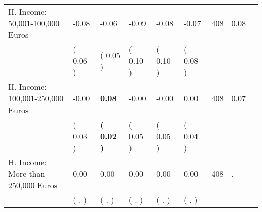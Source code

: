 \begin{tabular}{L{6.2cm} C{1.8cm} C{1.8cm} C{1.8cm} C{1.8cm} C{1.8cm} C{1.8cm} C{0.3cm} C{0.3cm}}
H. Income: 50,001-100,000 Euros &     -0.08 &     -0.06 &     -0.09 &     -0.08 &     -0.07  & 408 &       0.08 \\ 
 & (     0.06 ) & (     0.05 ) & (     0.10 ) & (     0.10 ) & (     0.08 )  & \\
H. Income: 100,001-250,000 Euros &     -0.00 & \textbf{     0.08} &     -0.00 &     -0.00 &      0.00  & 408 &       0.07 \\ 
 & (     0.03 ) & \textbf{(     0.02 )} & (     0.05 ) & (     0.05 ) & (     0.04 )  & \\
H. Income: More than 250,000 Euros &      0.00 &      0.00 &      0.00 &      0.00 &      0.00  & 408 &          . \\ 
 & (        . ) & (        . ) & (        . ) & (        . ) & (        . )  & \\
\bottomrule
\end{tabular}
